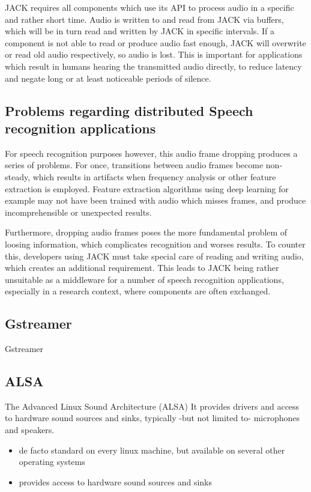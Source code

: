 JACK requires all components which use its API to process audio in a specific and rather short time. 
Audio is written to and read from JACK via buffers, which will be in turn read and written by JACK in specific intervals.
If a component is not able to read or produce audio fast enough, JACK will overwrite or read old audio respectively, so audio is lost. 
This is important for applications which result in humans hearing the transmitted audio directly, to reduce latency and negate long or at least noticeable periods of silence.

\subsection{Problems regarding distributed Speech recognition applications}
For speech recognition purposes however, this audio frame dropping produces a series of problems. 
For once, transitions between audio frames become non-steady, which results in artifacts when frequency analysis or other feature extraction is employed.
Feature extraction algorithms using deep learning for example may not have been trained with audio which misses frames, and produce incomprehensible or unexpected results.

Furthermore, dropping audio frames poses the more fundamental problem of loosing information, which complicates recognition and worses results. 
To counter this, developers using JACK must take special care of reading and writing audio, which creates an additional requirement.
This leads to JACK being rather unsuitable as a middleware for a number of speech recognition applications, especially in a research context, where components are often exchanged.

\subsection{Gstreamer}

Gstreamer \cite{Gstreamer}

\subsection{ALSA}
The Advanced Linux Sound Architecture (ALSA) 
It provides drivers and access to hardware sound sources and sinks, typically -but not limited to- microphones and speakers.

\begin{itemize}
	\item de facto standard on every linux machine, but available on several other operating systems
	\item provides access to hardware sound sources and sinks
\end{itemize}


